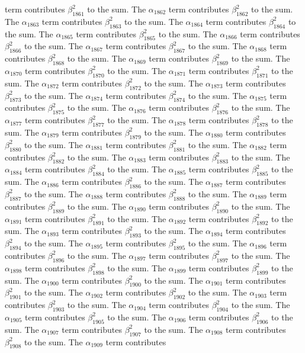 \begin{lemma}
term contributes $\beta_{1861}^{2}$ to the sum. The $\alpha_{1862}$ term contributes $\beta_{1862}^{2}$ to the sum. The $\alpha_{1863}$ term contributes $\beta_{1863}^{2}$ to the sum. The $\alpha_{1864}$ term contributes $\beta_{1864}^{2}$ to the sum. The $\alpha_{1865}$ term contributes $\beta_{1865}^{2}$ to the sum. The $\alpha_{1866}$ term contributes $\beta_{1866}^{2}$ to the sum. The $\alpha_{1867}$ term contributes $\beta_{1867}^{2}$ to the sum. The $\alpha_{1868}$ term contributes $\beta_{1868}^{2}$ to the sum. The $\alpha_{1869}$ term contributes $\beta_{1869}^{2}$ to the sum. The $\alpha_{1870}$ term contributes $\beta_{1870}^{2}$ to the sum. The $\alpha_{1871}$ term contributes $\beta_{1871}^{2}$ to the sum. The $\alpha_{1872}$ term contributes $\beta_{1872}^{2}$ to the sum. The $\alpha_{1873}$ term contributes $\beta_{1873}^{2}$ to the sum. The $\alpha_{1874}$ term contributes $\beta_{1874}^{2}$ to the sum. The $\alpha_{1875}$ term contributes $\beta_{1875}^{2}$ to the sum. The $\alpha_{1876}$ term contributes $\beta_{1876}^{2}$ to the sum. The $\alpha_{1877}$ term contributes $\beta_{1877}^{2}$ to the sum. The $\alpha_{1878}$ term contributes $\beta_{1878}^{2}$ to the sum. The $\alpha_{1879}$ term contributes $\beta_{1879}^{2}$ to the sum. The $\alpha_{1880}$ term contributes $\beta_{1880}^{2}$ to the sum. The $\alpha_{1881}$ term contributes $\beta_{1881}^{2}$ to the sum. The $\alpha_{1882}$ term contributes $\beta_{1882}^{2}$ to the sum. The $\alpha_{1883}$ term contributes $\beta_{1883}^{2}$ to the sum. The $\alpha_{1884}$ term contributes $\beta_{1884}^{2}$ to the sum. The $\alpha_{1885}$ term contributes $\beta_{1885}^{2}$ to the sum. The $\alpha_{1886}$ term contributes $\beta_{1886}^{2}$ to the sum. The $\alpha_{1887}$ term contributes $\beta_{1887}^{2}$ to the sum. The $\alpha_{1888}$ term contributes $\beta_{1888}^{2}$ to the sum. The $\alpha_{1889}$ term contributes $\beta_{1889}^{2}$ to the sum. The $\alpha_{1890}$ term contributes $\beta_{1890}^{2}$ to the sum. The $\alpha_{1891}$ term contributes $\beta_{1891}^{2}$ to the sum. The $\alpha_{1892}$ term contributes $\beta_{1892}^{2}$ to the sum. The $\alpha_{1893}$ term contributes $\beta_{1893}^{2}$ to the sum. The $\alpha_{1894}$ term contributes $\beta_{1894}^{2}$ to the sum. The $\alpha_{1895}$ term contributes $\beta_{1895}^{2}$ to the sum. The $\alpha_{1896}$ term contributes $\beta_{1896}^{2}$ to the sum. The $\alpha_{1897}$ term contributes $\beta_{1897}^{2}$ to the sum. The $\alpha_{1898}$ term contributes $\beta_{1898}^{2}$ to the sum. The $\alpha_{1899}$ term contributes $\beta_{1899}^{2}$ to the sum. The $\alpha_{1900}$ term contributes $\beta_{1900}^{2}$ to the sum. The $\alpha_{1901}$ term contributes $\beta_{1901}^{2}$ to the sum. The $\alpha_{1902}$ term contributes $\beta_{1902}^{2}$ to the sum. The $\alpha_{1903}$ term contributes $\beta_{1903}^{2}$ to the sum. The $\alpha_{1904}$ term contributes $\beta_{1904}^{2}$ to the sum. The $\alpha_{1905}$ term contributes $\beta_{1905}^{2}$ to the sum. The $\alpha_{1906}$ term contributes $\beta_{1906}^{2}$ to the sum. The $\alpha_{1907}$ term contributes $\beta_{1907}^{2}$ to the sum. The $\alpha_{1908}$ term contributes $\beta_{1908}^{2}$ to the sum. The $\alpha_{1909}$ term contributes 
\end{lemma}
